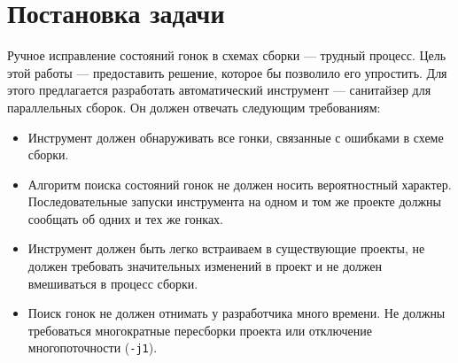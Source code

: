\section{Постановка задачи}
\label{sec:Chapter1} 


Ручное исправление состояний гонок в схемах сборки --- трудный процесс. Цель этой работы --- предоставить решение, которое бы позволило его упростить. Для этого предлагается разработать автоматический инструмент --- санитайзер для параллельных сборок. Он должен отвечать следующим требованиям:

\begin{itemize}
	\item Инструмент должен обнаруживать все гонки, связанные с ошибками в схеме сборки.
	\item Алгоритм поиска состояний гонок не должен носить вероятностный характер. Последовательные запуски инструмента на одном и том же проекте должны сообщать об одних и тех же гонках. 
	\item Инструмент должен быть легко встраиваем в существующие проекты, не должен требовать значительных изменений в проект и не должен вмешиваться в процесс сборки. 
	\item Поиск гонок не должен отнимать у разработчика много времени. Не должны требоваться многократные пересборки проекта или отключение многопоточности (\texttt{-j1}).
\end{itemize}
